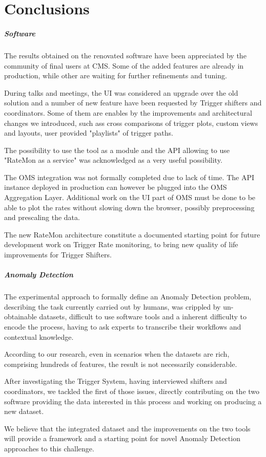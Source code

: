 \chapter{Conclusions}

\paragraph{Software} The results obtained on the renovated software have been appreciated by the community of final users at CMS. Some of the added features are already in production, while other are waiting for further refinements and tuning.

During talks and meetings, the UI was considered an upgrade over the old solution and a number of new feature have been requested by Trigger shifters and coordinators. Some of them are enables by the improvements and architectural changes we introduced, such ass cross comparisons of trigger plots, custom views and layouts, user provided "playlists" of trigger paths.

The possibility to use the tool as a module and the API allowing to use "RateMon as a service" was acknowledged as a very useful possibility.

The OMS integration was not formally completed due to lack of time. The API instance deployed in production can however be plugged into the OMS Aggregation Layer. Additional work on the UI part of OMS must be done to be able to plot the rates without slowing down the browser, possibly preprocessing and prescaling the data.

The new RateMon architecture constitute a documented starting point for future development work on Trigger Rate monitoring, to bring new quality of life improvements for Trigger Shifters.

\paragraph{Anomaly Detection}

The experimental approach to formally define an Anomaly Detection problem, describing the task currently carried out by humans, was crippled by un-obtainable datasets, difficult to use software tools and a inherent difficulty to encode the process, having to ask experts to transcribe their workflows and contextual knowledge.

According to our research, even in scenarios when the datasets are rich, comprising hundreds of features, the result is not necessarily considerable.

After investigating the Trigger System, having interviewed shifters and coordinators, we tackled the first of those issues, directly contributing on the two software providing the data interested in this process and working on producing a new dataset.

We believe that the integrated dataset and the improvements on the two tools will provide a framework and a starting point for novel Anomaly Detection approaches to this challenge.